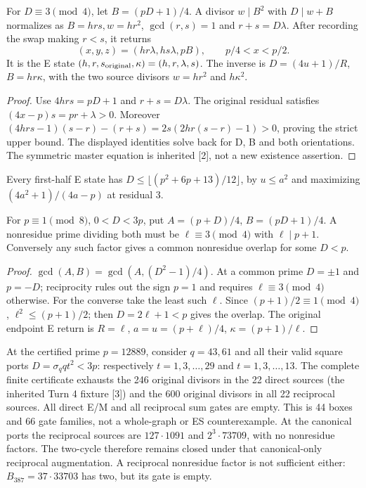 \documentclass[11pt,reqno]{amsart}
\begin{document}
\begin{proposition}
For $D\equiv3\pmod4$, let $B=(pD+1)/4$. A divisor $w\mid B^2$ with
$D\mid w+B$ normalizes as $B=hrs,w=hr^2$, $\gcd(r,s)=1$ and
$r+s=D\lambda$. After recording the swap making $r<s$, it returns
\[
 (x,y,z)=(hr\lambda,hs\lambda,pB),\qquad p/4<x<p/2.
\]
It is the E state $(h,r,s_{\rm original},\kappa)=(h,r,\lambda,s)$.
The inverse is $D=(4u+1)/R$, $B=hr\kappa$, with the two source divisors
$w=hr^2$ and $h\kappa^2$.
\end{proposition}
\begin{proof}
Use $4hrs=pD+1$ and $r+s=D\lambda$. The original residual satisfies
$(4x-p)s=pr+\lambda>0$. Moreover
$(4hrs-1)(s-r)-(r+s)=2s(2hr(s-r)-1)>0$, proving the strict upper bound.
The displayed identities solve back for D, B and both orientations. The symmetric
master equation is inherited [2], not a new existence assertion.
\end{proof}
Every first-half E state has $D\le\lfloor(p^2+6p+13)/12\rfloor$, by
$u\le a^2$ and maximizing $(4a^2+1)/(4a-p)$ at residual 3.

\begin{proposition}
For $p\equiv1\pmod8$, $0<D<3p$, put $A=(p+D)/4$, $B=(pD+1)/4$.
A nonresidue prime dividing both must be $\ell\equiv3\pmod4$ with
$\ell\mid p+1$. Conversely any such factor gives a common nonresidue overlap
for some $D<p$.
\end{proposition}
\begin{proof}
$\gcd(A,B)=\gcd(A,(D^2-1)/4)$. At a common prime $D=\pm1$ and $p=-D$;
reciprocity rules out the sign $p=1$ and requires $\ell\equiv3\pmod4$ otherwise.
For the converse take the least such $\ell$. Since $(p+1)/2\equiv1\pmod4$,
$\ell^2\le(p+1)/2$; then $D=2\ell+1<p$ gives the overlap. The original
endpoint E return is $R=\ell$, $a=u=(p+\ell)/4$, $\kappa=(p+1)/\ell$.
\end{proof}

At the certified prime $p=12889$, consider $q=43,61$ and all their valid square
ports $D=\sigma_q qt^2<3p$: respectively $t=1,3,\ldots,29$ and
$t=1,3,\ldots,13$. The complete finite certificate exhausts the 246 original
divisors in the 22 direct sources (the inherited Turn 4 fixture [3]) and the
600 original divisors in all 22 reciprocal sources. All direct E/M and all
reciprocal sum gates are empty. This is 44 boxes and 66 gate families, not a
whole-graph or ES counterexample. At the canonical ports the reciprocal sources
are $127\cdot1091$ and $2^3\cdot73709$, with no nonresidue factors. The two-cycle
therefore remains closed under that canonical-only reciprocal augmentation.
A reciprocal nonresidue factor is not sufficient either: $B_{387}=37\cdot33703$
has two, but its gate is empty.
\end{document}
